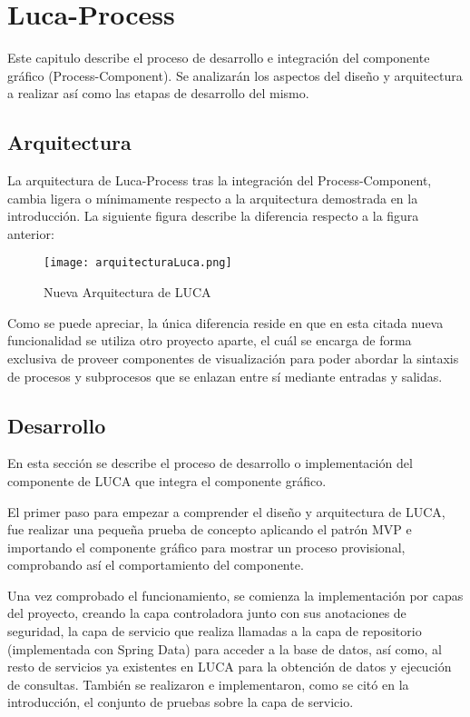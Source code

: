 \chapter{Luca-Process}
	
Este capitulo describe el proceso de desarrollo e integración del componente gráfico (Process-Component). Se analizarán los aspectos del diseño y arquitectura a realizar así como las etapas de desarrollo del mismo.
	
\section{Arquitectura}

La arquitectura  de Luca-Process tras la integración del Process-Component, cambia ligera o mínimamente respecto a la arquitectura demostrada en la introducción. La siguiente figura describe la diferencia respecto a la figura anterior:

\begin{figure}[H]
	\centering
	\texttt{[image: arquitecturaLuca.png]}
	\caption{Nueva Arquitectura de LUCA}\label{fig:arquitecturaLuca}
\end{figure}

Como se puede apreciar, la única diferencia reside en que en esta citada nueva funcionalidad se utiliza otro proyecto aparte, el cuál se encarga de forma exclusiva de proveer componentes de visualización para poder abordar la sintaxis de procesos y subprocesos que se enlazan entre sí mediante entradas y salidas.

\section{Desarrollo}

En esta sección se describe el proceso de desarrollo o implementación del componente de LUCA que integra el componente gráfico.


El primer paso para empezar a comprender el diseño y arquitectura de LUCA, fue realizar una pequeña prueba de concepto aplicando el patrón MVP\cite{mvp} e importando el componente gráfico para mostrar un proceso provisional, comprobando así el comportamiento del componente.



Una vez comprobado el funcionamiento, se comienza la implementación por capas del proyecto, creando la capa controladora junto con sus anotaciones de seguridad, la capa de servicio que realiza llamadas a la capa de repositorio (implementada con Spring Data\cite{jpa}) para acceder a la base de datos, así como, al resto de servicios ya existentes en LUCA para la obtención de datos y ejecución de consultas. También se realizaron e implementaron, como se citó en la introducción, el conjunto de pruebas sobre la capa de servicio.



